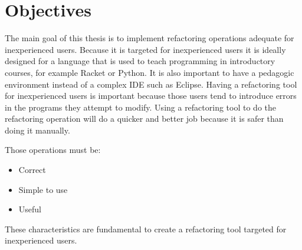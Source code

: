 
% 
% 

\section{Objectives}





The main goal of this thesis is to implement refactoring operations adequate for inexperienced users.
Because it is targeted for inexperienced users it is ideally designed for a language that is used to teach programming in introductory courses, for example Racket or Python.
It is also important to have a pedagogic environment instead of a complex IDE such as Eclipse.
Having a refactoring tool for inexperienced users is important because those users tend to introduce errors in the programs they attempt to modify.
Using a refactoring tool to do the refactoring operation will do a quicker and better job because it is safer than doing it manually.

Those operations must be:
\begin{itemize}
\item Correct
\item Simple to use
\item Useful
\end{itemize}

These characteristics are fundamental to create a refactoring tool targeted for inexperienced users.